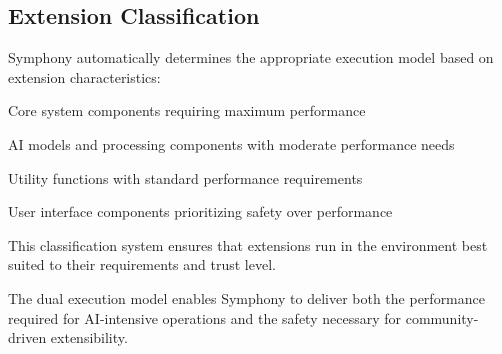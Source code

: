 \subsection*{Extension Classification}

Symphony automatically determines the appropriate execution model based on extension characteristics:

\begin{description}[leftmargin=3cm,labelwidth=2.5cm]
    \item[\textbf{Infrastructure}] Core system components requiring maximum performance
    \item[\textbf{Instruments}] AI models and processing components with moderate performance needs
    \item[\textbf{Operators}] Utility functions with standard performance requirements
    \item[\textbf{Motifs}] User interface components prioritizing safety over performance
\end{description}

This classification system ensures that extensions run in the environment best suited to their requirements and trust level.

\begin{successbox}
The dual execution model enables Symphony to deliver both the performance required for AI-intensive operations and the safety necessary for community-driven extensibility.
\end{successbox}